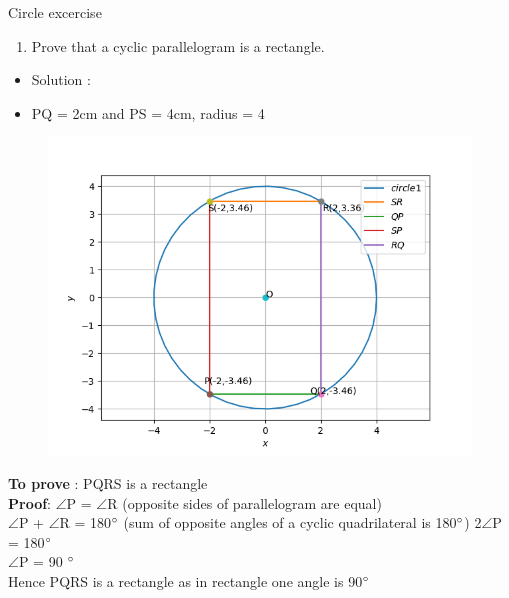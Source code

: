 \begin{frame}{Circle excercise}
\begin{enumerate}
\conti
\item Prove that a cyclic parallelogram is a rectangle.
\end{enumerate}
\seti
\begin{itemize}
\item Solution :
\begin{center}

\end{center}
\item PQ = 2cm and PS = 4cm, radius = 4
\end{itemize}
\end{frame}
\begin{frame}
\begin{figure}
\includegraphics[scale=.4]{./CODES/quad/QUAD_P.png}
\end{figure}
\end{frame}
\begin{frame}
\textbf{To prove} : PQRS is a rectangle\\
\textbf{Proof}:
 $\angle$P = $\angle$R (opposite sides of parallelogram are equal)\\
$\angle$P + $\angle$R = 180$\degree$ (sum of opposite angles of a cyclic quadrilateral is 180$\degree$)
2$\angle$P = 180$\degree$\\
$\angle$P = 90 $\degree$\\
Hence PQRS is a rectangle as in rectangle one angle is 90$\degree$\\
\end{frame}